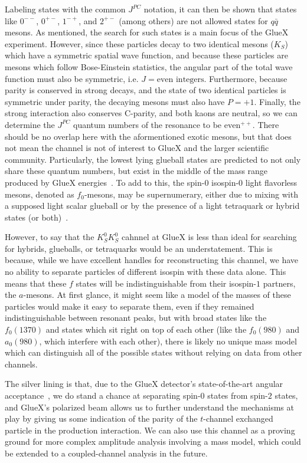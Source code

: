 Labeling states with the common $J^{PC}$ notation, it can then be shown that states like $0^{--}$, $0^{+-}$, $1^{-+}$, and $2^{+-}$ (among others) are not allowed states for $q\bar{q}$ mesons. As mentioned, the search for such states is a main focus of the GlueX experiment. However, since these particles decay to two identical mesons ($K_S$) which have a symmetric spatial wave function, and because these particles are mesons which follow Bose-Einstein statistics, the angular part of the total wave function must also be symmetric, i.e. $J = \text{even integers}$. Furthermore, because parity is conserved in strong decays, and the state of two identical particles is symmetric under parity, the decaying mesons must also have $P=+1$. Finally, the strong interaction also conserves C-parity, and both kaons are neutral, so we can determine the $J^{PC}$ quantum numbers of the resonance to be $\text{even}^{++}$. There should be no overlap here with the aformentioned exotic mesons, but that does not mean the channel is not of interest to GlueX and the larger scientific community. Particularly, the lowest lying glueball states are predicted to not only share these quantum numbers, but exist in the middle of the mass range produced by GlueX energies~\cite{Morningstar1999}. To add to this, the spin-$0$ isospin-$0$ light flavorless mesons, denoted as $f_0$-mesons, may be supernumerary, either due to mixing with a supposed light scalar glueball or by the presence of a light tetraquark or hybrid states (or both)~\cite{Zyla2020}.

However, to say that the $K_S^0K_S^0$ cahnnel at GlueX is less than ideal for searching for hybrids, glueballs, or tetraquarks would be an understatement. This is because, while we have excellent handles for reconstructing this channel, we have no ability to separate particles of different isospin with these data alone. This means that these $f$ states will be indistinguishable from their isospin-$1$ partners, the $a$-mesons. At first glance, it might seem like a model of the masses of these particles would make it easy to separate them, even if they remained indistinguishable between resonant peaks, but with broad states like the $f_0(1370)$ and states which sit right on top of each other (like the $f_0(980)$ and $a_0(980)$, which interfere with each other), there is likely no unique mass model which can distinguish all of the possible states without relying on data from other channels.

The silver lining is that, due to the GlueX detector's state-of-the-art angular acceptance~\cite{Adhikari2021}, we do stand a chance at separating spin-$0$ states from spin-$2$ states, and GlueX's polarized beam allows us to further understand the mechanisms at play by giving us some indication of the parity of the $t$-channel exchanged particle in the production interaction. We can also use this channel as a proving ground for more complex amplitude analysis involving a mass model, which could be extended to a coupled-channel analysis in the future.


